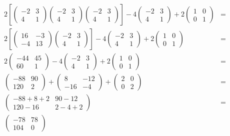 \documentclass[a4paper,11pt,twoside]{report}
\begin{document}
\begin{align*}
	2\left[ \begin{pmatrix} -2 & 3 \\ 4 & 1 \end{pmatrix}\begin{pmatrix} -2 & 3 \\ 4 & 1 \end{pmatrix}\begin{pmatrix} -2 & 3 \\ 4 & 1 \end{pmatrix} \right] - 4 \begin{pmatrix} -2 & 3 \\ 4 & 1 \end{pmatrix} + 2 \begin{pmatrix} 1 & 0 \\ 0 & 1 \end{pmatrix}&=  \\
	2\left[ \begin{pmatrix} 16 & -3 \\ -4 & 13 \end{pmatrix}\begin{pmatrix} -2 & 3 \\ 4 & 1 \end{pmatrix} \right] - 4 \begin{pmatrix} -2 & 3 \\ 4 & 1 \end{pmatrix} + 2 \begin{pmatrix} 1 & 0 \\ 0 & 1 \end{pmatrix}&=  \\
	2\begin{pmatrix} -44 & 45 \\ 60 & 1 \end{pmatrix} - 4 \begin{pmatrix} -2 & 3 \\ 4 & 1 \end{pmatrix} + 2 \begin{pmatrix} 1 & 0 \\ 0 & 1 \end{pmatrix}&=  \\
	\begin{pmatrix} -88 & 90 \\ 120 & 2 \end{pmatrix} + \begin{pmatrix} 8 & -12 \\ -16 & -4 \end{pmatrix} +  \begin{pmatrix} 2 & 0 \\ 0 & 2 \end{pmatrix}&=  \\
	\begin{pmatrix} -88 + 8 + 2 & 90 - 12 \\120 -16 & 2 - 4 + 2 \end{pmatrix}&=  \\
	\boxed{\begin{pmatrix} -78 & 78 \\104 & 0 \end{pmatrix} }
\end{align*}



\newpage
\end{document}
